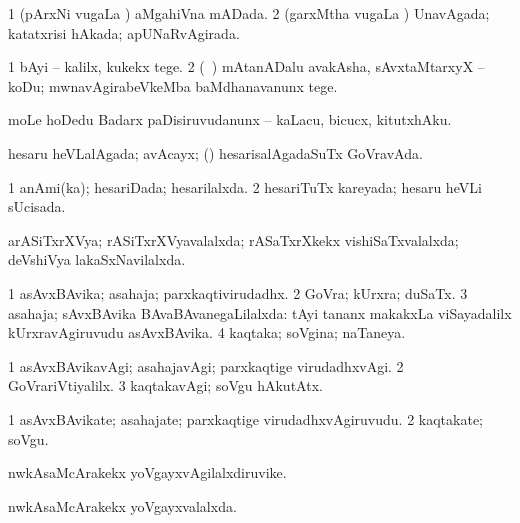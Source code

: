 \bentry
{} 
\gl{\gu}
\expl{}
\bmng
\bnum
\num{1} (pArxNi \mo vugaLa \vi) aMgahiVna mADada. 
\num{2} (garxMtha \mo vugaLa \vi) UnavAgada; katatxrisi hAkada; apUNaRvAgirada. 
\enum
\emng
\eentry

\bentry
{} 
\gl{\sakirx}
\expl{}
\bmng
\bnum
\num{1} bAyi -- kalilx, kukekx tege. 
\num{2} (\kanmu\ \rUpa) mAtanADalu avakAsha, sAvxtaMtarxyX -- koDu; mwnavAgirabeVkeMba baMdhanavanunx tege. 
\enum
\emng
\eentry 

\bentry
{} 
\gl{\sakirx}
\expl{}
\bmng
moLe hoDedu Badarx paDisiruvudanunx -- kaLacu, bicucx, kitutxhAku. 
\emng
\eentry

\bentry
{} 
\gl{\gu}
\expl{}
\bmng
hesaru heVLalAgada; avAcayx; (\kanmu) hesarisalAgadaSuTx GoVravAda. 
\emng
\eentry

\bentry
{} 
\gl{\gu}
\expl{}
\bmng
\bnum
\num{1} anAmi(ka); hesariDada; hesarilalxda. 
\num{2} hesariTuTx kareyada; hesaru heVLi sUcisada. 
\enum
\emng
\eentry

\bentry
{} 
\gl{\gu}
\expl{}
\bmng
arASiTxrXVya; rASiTxrXVyavalalxda; rASaTxrXkekx vishiSaTxvalalxda; deVshiVya lakaSxNavilalxda. 
\emng
\eentry

\bentry
{} 
\gl{\gu}
\expl{}
\bmng
\bnum
\num{1} asAvxBAvika; asahaja; parxkaqtivirudadhx. 
\num{2} GoVra; kUrxra; duSaTx. 
\num{3} asahaja; sAvxBAvika BAvaBAvanegaLilalxda:  tAyi tananx makakxLa viSayadalilx kUrxravAgiruvudu asAvxBAvika. 
\num{4} kaqtaka; soVgina; naTaneya. 
\enum
\emng
\eentry

\bentry
{} 
\gl{\kirxvi}
\expl{}
\bmng
\bnum
\num{1} asAvxBAvikavAgi; asahajavAgi; parxkaqtige virudadhxvAgi. 
\num{2} GoVrariVtiyalilx. 
\num{3} kaqtakavAgi; soVgu hAkutAtx. 
\enum
\emng
\eentry

\bentry
{} 
\gl{\nA}
\expl{}
\bmng
\bnum
\num{1} asAvxBAvikate; asahajate; parxkaqtige virudadhxvAgiruvudu. 
\num{2} kaqtakate; soVgu. 
\enum
\emng
\eentry

\bentry
{} 
\gl{\nA}
\expl{}
\bmng
nwkAsaMcArakekx yoVgayxvAgilalxdiruvike. 
\emng
\eentry

\bentry
{} 
\gl{\gu}
\expl{}
\bmng
nwkAsaMcArakekx yoVgayxvalalxda. 
\emng
\eentry

